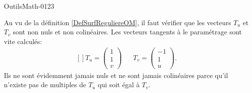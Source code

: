 
\begin{corrige}{OutilsMath-0123}

    Au vu de la définition \ref{DefSurfReguliereOM}, il faut vérifier que les vecteurs \( T_u\) et \( T_v\) sont non nuls et non colinéaires. Les vecteurs tangents à le paramétrage sont vite calculés:
    \begin{equation}
        \begin{aligned}[]
            T_u=\begin{pmatrix}
                1    \\ 
                1    \\ 
                v    
            \end{pmatrix}&&T_v=\begin{pmatrix}
                -1    \\ 
                1    \\ 
                u    
            \end{pmatrix}.
        \end{aligned}
    \end{equation}
    Ils ne sont évidemment jamais nuls et ne sont jamais colinéaires parce qu'il n'existe pas de multiples de \( T_u\) qui soit égal à \( T_v\).


\end{corrige}
